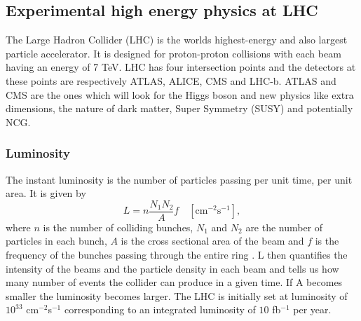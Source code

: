 \subsection{Experimental high energy physics at LHC}
The Large Hadron Collider (LHC) is the worlds highest-energy and also largest particle accelerator. It is designed for proton-proton collisions with each beam having an energy of 7 TeV. LHC has four intersection points and the detectors at these points are respectively ATLAS, ALICE, CMS and LHC-b. ATLAS and CMS are the ones which will look for the Higgs boson and new physics like extra dimensions, the nature of dark matter, Super Symmetry (SUSY) and potentially NCG.

\subsubsection{Luminosity}
The instant luminosity is the number of particles passing per unit time, per unit area. It is given by
\begin{equation}
	L=n\frac{N_{1}N_{2}}{A}f \quad [\mbox{cm}^{-2}\mbox{s}^{-1}],
\end{equation}
where $n$ is the number of colliding bunches, $N_{1}$ and $N_{2}$ are the number of particles in each bunch, $A$ is the cross sectional area of the beam and $f$ is the frequency of the bunches passing through the entire ring \cite{martin1998pp}. L then quantifies the intensity of the beams and the particle density in each beam and tells us how many number of events the collider can produce in a given time. If A becomes smaller the luminosity becomes larger. The LHC is initially set at luminosity of $10^33$ cm$^{-2}$s$^{-1}$ corresponding to an integrated luminosity of $10$ fb$^{-1}$ per year.

